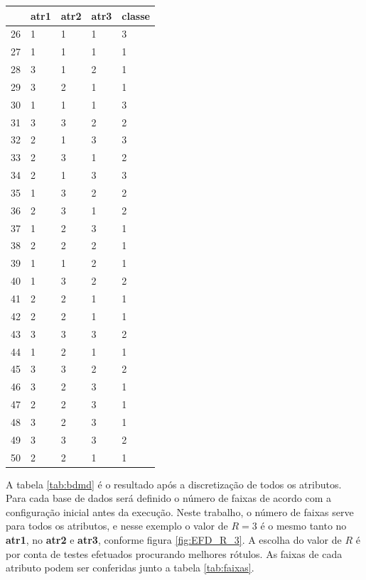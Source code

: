 \begin{table}[!ht]
\begin{tabular}{ |lllll| }
\hline
  & atr1 & atr2 & atr3 & classe \\ \hline
26	&	1	&	1	&	1	&	3	\\	\hline
27	&	1	&	1	&	1	&	1	\\	\hline
28	&	3	&	1	&	2	&	1	\\	\hline
29	&	3	&	2	&	1	&	1	\\	\hline
30	&	1	&	1	&	1	&	3	\\	\hline
31	&	3	&	3	&	2	&	2	\\	\hline
32	&	2	&	1	&	3	&	3	\\	\hline
33	&	2	&	3	&	1	&	2	\\	\hline
34	&	2	&	1	&	3	&	3	\\	\hline
35	&	1	&	3	&	2	&	2	\\	\hline
36	&	2	&	3	&	1	&	2	\\	\hline
37	&	1	&	2	&	3	&	1	\\	\hline
38	&	2	&	2	&	2	&	1	\\	\hline
39	&	1	&	1	&	2	&	1	\\	\hline
40	&	1	&	3	&	2	&	2	\\	\hline
41	&	2	&	2	&	1	&	1	\\	\hline
42	&	2	&	2	&	1	&	1	\\	\hline
43	&	3	&	3	&	3	&	2	\\	\hline
44	&	1	&	2	&	1	&	1	\\	\hline
45	&	3	&	3	&	2	&	2	\\	\hline
46	&	3	&	2	&	3	&	1	\\	\hline
47	&	2	&	2	&	3	&	1	\\	\hline
48	&	3	&	2	&	3	&	1	\\	\hline
49	&	3	&	3	&	3	&	2	\\	\hline
50	&	2	&	2	&	1	&	1	\\	\hline

\end{tabular}
\end{table}

A tabela \ref{tab:bdmd} é o resultado após a discretização de todos os atributos. Para cada base de dados será definido o número de faixas de acordo com a configuração inicial antes da execução. Neste trabalho, o número de faixas serve para todos os atributos, e nesse exemplo o valor de ${R=3}$ é o mesmo tanto no \textbf{atr1},  no \textbf{atr2} e \textbf{atr3}, conforme figura \ref{fig:EFD_R_3}. A escolha do valor de ${R}$ é por conta de testes efetuados procurando melhores rótulos. As faixas de cada atributo podem ser conferidas junto a tabela \ref{tab:faixas}. 

